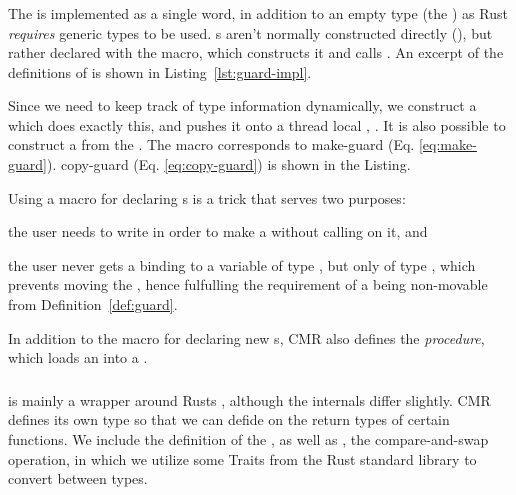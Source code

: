 \subsubsection{}

The  is implemented as a single word, in addition to an empty type (the
) as Rust \emph{requires} generic types to be used. s aren't normally
constructed directly (), but rather declared with the
 macro, which constructs it and calls .
An excerpt of the definitions of  is shown in Listing~\ref{lst:guard-impl}.
\begin{figure}[t]
  
\end{figure}

Since we need to keep track of type information dynamically, we construct a 
which does exactly this, and pushes it onto a thread local , .  It is also
possible to construct a  from the .
The  macro corresponds to make-guard (Eq. \ref{eq:make-guard}). copy-guard
(Eq. \ref{eq:copy-guard}) is shown in the Listing.

Using a macro for declaring s is a trick that serves two purposes:
\begin{enumerate*}[1) ]
  \item the user needs to write  in order to make a  without calling
     on it,
  and\item the user never gets a binding to a variable of type , but only of type
    , which prevents moving the , hence fulfulling the requirement of a
     being non-movable from Definition~\ref{def:guard}.
\end{enumerate*}

In addition to the  macro for declaring new s, CMR also defines the
 \emph{procedure}, which loads an  into a .


\subsubsection{}

 is mainly a wrapper around Rusts , although the internals differ
slightly. CMR defines its own type so that we can defide on the return types of certain functions.
We include the definition of the , as well as , the compare-and-swap
operation, in which we utilize some Traits from the Rust standard library to convert between types.

